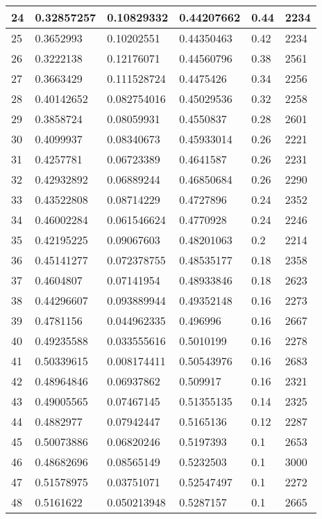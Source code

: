\begin{longtable}{|l|l|l|l|l|l|}
24 & 0.32857257 & 0.10829332 & 0.44207662 & 0.44 & 2234 \\ \hline 
25 & 0.3652993 & 0.10202551 & 0.44350463 & 0.42 & 2234 \\ \hline 
26 & 0.3222138 & 0.12176071 & 0.44560796 & 0.38 & 2561 \\ \hline 
27 & 0.3663429 & 0.111528724 & 0.4475426 & 0.34 & 2256 \\ \hline 
28 & 0.40142652 & 0.082754016 & 0.45029536 & 0.32 & 2258 \\ \hline 
29 & 0.3858724 & 0.08059931 & 0.4550837 & 0.28 & 2601 \\ \hline 
30 & 0.4099937 & 0.08340673 & 0.45933014 & 0.26 & 2221 \\ \hline 
31 & 0.4257781 & 0.06723389 & 0.4641587 & 0.26 & 2231 \\ \hline 
32 & 0.42932892 & 0.06889244 & 0.46850684 & 0.26 & 2290 \\ \hline 
33 & 0.43522808 & 0.08714229 & 0.4727896 & 0.24 & 2352 \\ \hline 
34 & 0.46002284 & 0.061546624 & 0.4770928 & 0.24 & 2246 \\ \hline 
35 & 0.42195225 & 0.09067603 & 0.48201063 & 0.2 & 2214 \\ \hline 
36 & 0.45141277 & 0.072378755 & 0.48535177 & 0.18 & 2358 \\ \hline 
37 & 0.4604807 & 0.07141954 & 0.48933846 & 0.18 & 2623 \\ \hline 
38 & 0.44296607 & 0.093889944 & 0.49352148 & 0.16 & 2273 \\ \hline 
39 & 0.4781156 & 0.044962335 & 0.496996 & 0.16 & 2667 \\ \hline 
40 & 0.49235588 & 0.033555616 & 0.5010199 & 0.16 & 2278 \\ \hline 
41 & 0.50339615 & 0.008174411 & 0.50543976 & 0.16 & 2683 \\ \hline 
42 & 0.48964846 & 0.06937862 & 0.509917 & 0.16 & 2321 \\ \hline 
43 & 0.49005565 & 0.07467145 & 0.51355135 & 0.14 & 2325 \\ \hline 
44 & 0.4882977 & 0.07942447 & 0.5165136 & 0.12 & 2287 \\ \hline 
45 & 0.50073886 & 0.06820246 & 0.5197393 & 0.1 & 2653 \\ \hline 
46 & 0.48682696 & 0.08565149 & 0.5232503 & 0.1 & 3000 \\ \hline 
47 & 0.51578975 & 0.03751071 & 0.52547497 & 0.1 & 2272 \\ \hline 
48 & 0.5161622 & 0.050213948 & 0.5287157 & 0.1 & 2665 \\ \hline 

\end{longtable}
